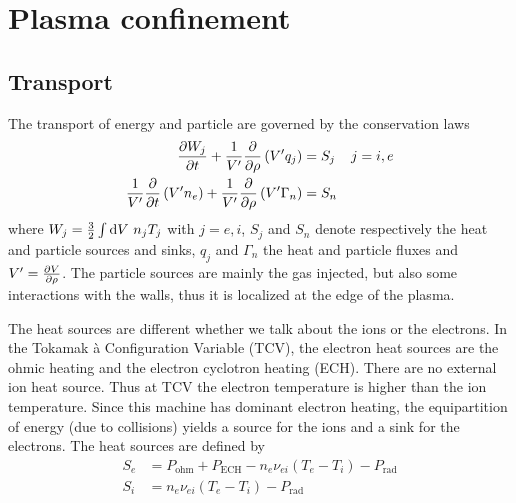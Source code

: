 \chapter{Plasma confinement}\label{sec:confinement}\thispagestyle{fancy}
\section{Transport}\label{sec:confinement:transport}
The transport of energy and particle are governed by the conservation laws \cite{heatDiff,fable2006}
\begin{align}
	\dfrac{\partial W_j}{\partial t} + \frac{1}{V'} \dfrac{\partial }{\partial \rho} \left( V' q_j \right) & = S_j                                      & j = i,e \label{eq:confinement:transport:heat:heatDiff}\\
	\frac{1}{V'} \dfrac{\partial }{\partial t} \left( V' n_e \right) + \frac{1}{V'} \dfrac{\partial }{\partial \rho} \left( V' \Gamma_n \right) & = S_n           \label{eq:confinement:transport:particle:particleDiff}
\end{align}
where $W_j = \frac{3}{2} \int\textrm{d} V\  n_j T_j$ with $j = e,i$, $S_j$ and $S_n$ denote respectively the heat and particle sources and sinks, $q_j$ and $\Gamma_n$ the heat and particle fluxes and $V' = \frac{\partial V}{\partial \rho}$. The particle sources are mainly the gas injected, but also some interactions with the walls, thus it is localized at the edge of the plasma.

The heat sources are different whether we talk about the ions or the electrons. In the Tokamak \`a Configuration Variable (TCV), the electron heat sources are the ohmic heating and the electron cyclotron heating (ECH). There are no external ion heat source. Thus at TCV the electron temperature is higher than the ion temperature. Since this machine has dominant electron heating, the equipartition of energy (due to collisions) yields a source for the ions and a sink for the electrons. The heat sources are defined by \cite{heatDiff}
\begin{align*}
	S_e & = P_{\textrm{ohm}} + P_{\textrm{ECH}} - n_e \nu_{ei} ( T_e - T_i ) - P_{\textrm{rad}}\\
	S_i & = n_e \nu_{ei} ( T_e - T_i ) - P_{\textrm{rad}}
\end{align*}

